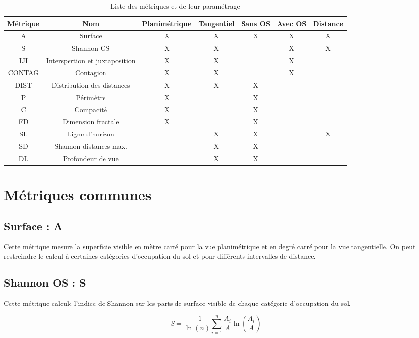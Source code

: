 \documentclass{report}
\begin{document}
\begin{table}[H]
	\begin{tabular}{|c|c|c|c|c|c|c|}
		\hline
		Métrique & Nom & Planimétrique & Tangentiel & Sans OS & Avec OS & Distance\\
		\hline
		A & Surface & X & X & X & X & X\\
		\hline
		S & Shannon OS & X & X &  & X & X\\
		\hline
		IJI & Interspertion et juxtaposition & X & X &  & X & \\
		\hline
		CONTAG & Contagion & X & X &  & X & \\
		\hline
		DIST & Distribution des distances & X & X & X &  & \\
		\hline
		P & Périmètre & X &  & X &  & \\
		\hline
		C & Compacité & X &  & X &  & \\
		\hline
		FD & Dimension fractale & X &  & X &  & \\
		\hline
		SL & Ligne d'horizon &  & X & X &  & X \\
		\hline
		SD & Shannon distances max. &  & X & X &  & \\
		\hline
		DL & Profondeur de vue &  & X & X &  & \\		
		\hline
	\end{tabular}
	\caption{Liste des métriques et de leur paramétrage}
	\label{metrics_tab}
\end{table}

\section{Métriques communes}

\subsection{Surface : A}
Cette métrique mesure la superficie visible en mètre carré pour la vue planimétrique et en degré carré pour la vue tangentielle. On peut restreindre le calcul à certaines catégories d'occupation du sol et pour différents intervalles de distance.


\subsection{Shannon OS : S}
Cette métrique calcule l'indice de Shannon sur les parts de surface visible de chaque catégorie d'occupation du sol.

$$S = \frac{-1}{\ln(n)}\sum_{i=1}^{n}\frac{A_i}{A}\ln\left(\frac{A_i}{A}\right)$$
\end{document}
